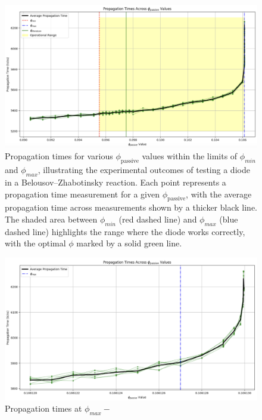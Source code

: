 \begin{figure}
    \centering
    \includegraphics[width=\linewidth]{Screenshot 2024-03-09 at 10.35.01.png}
    \caption{Propagation times for various $\phi_{\text{passive}}$ values within the limits of $\phi_{min}$ and $\phi_{max}$, illustrating the experimental outcomes of testing a diode in a Belousov–Zhabotinsky reaction. Each point represents a propagation time measurement for a given $\phi_{\text{passive}}$, with the average propagation time across measurements shown by a thicker black line. The shaded area between $\phi_{min}$ (red dashed line) and $\phi_{max}$ (blue dashed line) highlights the range where the diode works correctly, with the optimal $\phi$ marked by a solid green line.}
    \label{fig:phi_passive_propagation_times}
    
\end{figure}

\begin{figure}
    \centering
    \includegraphics[width=1\linewidth]{Screenshot 2024-03-10 at 07.50.59.png}
    \caption{Propagation times at $\phi_{max} - $}
    \label{fig:phi_passive_propagation_times_detail_max}
\end{figure}



